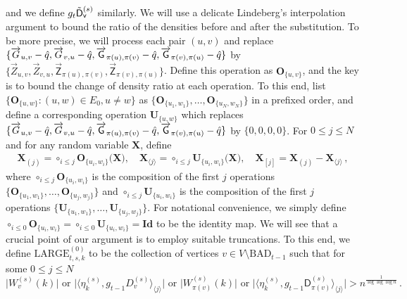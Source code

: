 \documentclass[11pt]{article}
\numberwithin{equation}{section}
\begin{document}
and we define $g_{t} \Tilde{\mathsf{D}}^{(s)}_{\mathsf{v}}$ similarly. We will use a delicate Lindeberg's interpolation argument to bound the ratio of the densities before and after the substitution. To be more precise, we will process each pair $(u, v)$ and replace $\{ \overrightarrow{G}_{u,v}- \Hat{q}, \overrightarrow{G}_{v,u}-\Hat{q}, \overrightarrow{\mathsf{G}}_{\pi(u),\pi(v)}-\Hat{q}, \overrightarrow{\mathsf{G}}_{\pi(v),\pi(u)}-\Hat{q}  \}$ by $\{ \overrightarrow{Z}_{u,v}, \overrightarrow{Z}_{v,u}, \overrightarrow{\mathsf{Z}}_{\pi(u),\pi(v)}, \overrightarrow{\mathsf{Z}}_{\pi(v),\pi(u)}  \}$. Define this operation as $\mathbf{O}_{ \{ u,v \} }$, and the key is to bound the change of density ratio at each operation. To this end, list $\{ \mathbf{O}_{\{u,w\}} : (u,w) \in E_0, u \neq w \}$ as $\{ \mathbf{O}_{\{ u_1,w_1 \}}, \ldots, \mathbf{O}_{\{ u_N,w_N \}} \}$ in a prefixed order, and define a corresponding operation $\mathbf{U}_{\{ u,w \}}$ which replaces $\{ \overrightarrow{G}_{u,v}- \Hat{q}, \overrightarrow{G}_{v,u}-\Hat{q}, \overrightarrow{\mathsf{G}}_{\pi(u),\pi(v)}-\Hat{q}, \overrightarrow{\mathsf{G}}_{\pi(v),\pi(u)}-\Hat{q} \}$ by $\{0, 0, 0, 0\}$. For $0 \leq j \leq N$ and for any random variable $\mathbf{X}$, define 
\begin{align}
    \mathbf{X}_{(j)} = \circ_{i \leq j} \mathbf{O}_{ \{ u_i,w_i \} } \big( \mathbf{X} \big), \quad \mathbf{X}_{ \langle j \rangle} = \circ_{i \leq j} \mathbf{U}_{ \{ u_i,w_i \} } \big( \mathbf{X} \big), \quad \mathbf{X}_{[j]} = \mathbf{X}_{(j)} - \mathbf{X}_{ \langle j \rangle }\,, \label{equ-def-degree-after-j-substitution}
\end{align}
 where $\circ_{i \leq j} \mathbf{O}_{ \{ u_i,w_i \} }$ is the composition of the first $j$ operations $\{\mathbf{O}_{ \{ u_1,w_1 \} }, \ldots, \mathbf{O}_{ \{ u_j,w_j \} }\}$ and $\circ_{i \leq j} \mathbf{U}_{ \{ u_i, w_i \} }$ is the composition of the first $j$ operations  $\{\mathbf{U}_{ \{ u_1,w_1 \} }, \ldots, \mathbf{U}_{ \{ u_j,w_j \} }\}$.  For notational convenience, we simply define $\circ_{i \leq 0} \mathbf{O}_{\{ u_i, w_i \}} = \circ_{i \leq 0} \mathbf{U}_{\{ u_i, w_i \}} = \mathbf{Id}$ to be the identity map. We will see that a crucial point of our argument is to employ suitable truncations. To this end, we define
$\mathrm{LARGE}^{(0)}_{t,s,k} $ to be the collection of vertices $ v \in V \setminus \mathrm{BAD}_{t-1} $ such that  for some $0\leq j\leq N$
\begin{equation}\label{equ-def-set-LARGE-(0)}
 \big| W^{(s)}_v(k) \big| \mbox{ or } \big| \langle \eta^{(s)}_k, g_{t-1} {D}^{(s)}_v \rangle_{ \langle j \rangle } \big|  \mbox{ or }  \big| W^{(s)}_{\pi(v)}(k) \big|  \mbox{ or } \big| \langle \eta^{(s)}_k, g_{t-1} {\mathsf D}^{(s)}_{\pi(v)} \rangle_{ \langle j \rangle } \big|> n^{ \frac{1} {\log \log \log n}}\,.
 \end{equation}
\end{document}
